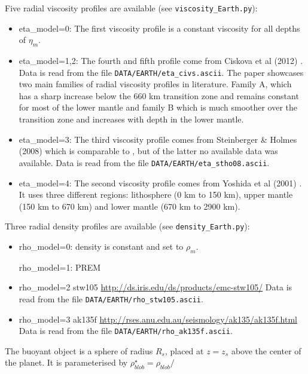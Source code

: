 
Five radial viscosity profiles are available (see {\tt viscosity\_Earth.py}):
\begin{itemize}
\item
{\python eta\_model=0}:
 The first viscosity profile is a constant viscosity for all depths of $\eta_m$. 

\item
{\python eta\_model=1,2}:
 The fourth and fifth profile come from Ciskova et al (2012) \cite{civs12}.
Data is read from the file \texttt{DATA/EARTH/eta\_civs.ascii}.
The paper showcases two main families of radial viscosity profiles in literature. Family A, which has a sharp
increase below the 660 km transition zone and remains constant for most of the lower mantle
and family B which is much smoother over the transition zone and increases with depth in the lower mantle.

\item 
{\python eta\_model=3}:
The third viscosity profile comes from Steinberger \& Holmes (2008) \cite{stho08}
which is comparable to \cite{stca06}, but of the latter no available data was available.
Data is read from the file \texttt{DATA/EARTH/eta\_stho08.ascii}.

\item
{\python eta\_model=4}:
 The second viscosity profile comes from Yoshida et al (2001) \cite{yohk01}. It uses three different regions: lithosphere (0 km to 150 km), upper mantle (150 km to 670 km) and lower mantle (670 km to 2900 km).

\end{itemize}

Three radial density profiles are available (see {\tt density\_Earth.py}):

\begin{itemize}
\item
{\python rho\_model=0}: density is constant and set to $\rho_m$.

{\python rho\_model=1}:
 PREM \cite{dzan81}

\item
{\python rho\_model=2}
 stw105 \cite{kued08} \url{http://ds.iris.edu/ds/products/emc-stw105/}
Data is read from the file \texttt{DATA/EARTH/rho\_stw105.ascii}.

\item
{\python rho\_model=3}
 ak135f \cite{keeb95} \url{http://rses.anu.edu.au/seismology/ak135/ak135f.html}
Data is read from the file \texttt{DATA/EARTH/rho\_ak135f.ascii}.


\end{itemize}


The buoyant object is a sphere of radius $R_s$, placed at $z=z_s$ above the 
center of the planet. It is parameterised by $\rho_{blob}^\star =\rho_{blob}/$ 

